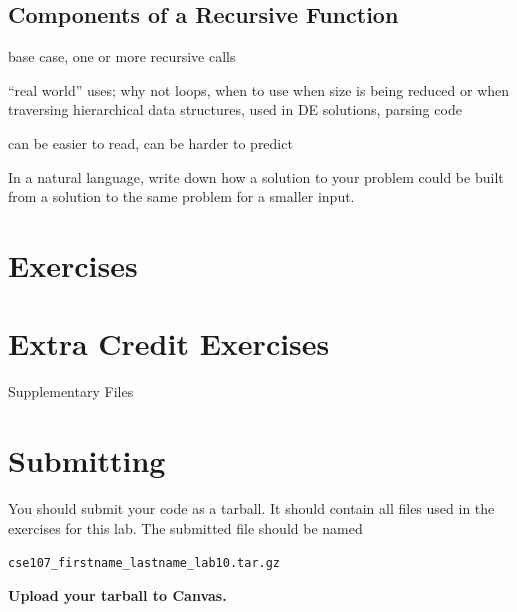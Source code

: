 \documentclass[11pt]{cselabheader}
\begin{document}
\subsection{Components of a Recursive Function}
base case, one or more recursive calls

``real world'' uses; why not loops, when to use
when size is being reduced
or
when traversing hierarchical data structures,
used in DE solutions, parsing code

can be easier to read, can be harder to predict

In a natural language, write down how a solution to your problem could be built from a solution to the same problem for a smaller input.

\newpage
\section{Exercises}

\begin{ex}[palindrome.py]
\end{ex}

\begin{ex}
\end{ex}

\begin{ex}[cesaro.py]
\end{ex}

\section{Extra Credit Exercises}

\begin{extraex}[lsystem.py]
\end{extraex}

\begin{infobox}{Supplementary Files}
\end{infobox}

\newpage
\section{Submitting}

You should submit your code as a tarball. It should contain all files
used in the exercises for this lab. The submitted file should be named
\begin{center}
  \texttt{cse107\_firstname\_lastname\_lab10.tar.gz}
\end{center}

\begin{center}
  \textbf{Upload your tarball to Canvas.}
\end{center}

\listofexercises
\listofextraexercises
\end{document}
